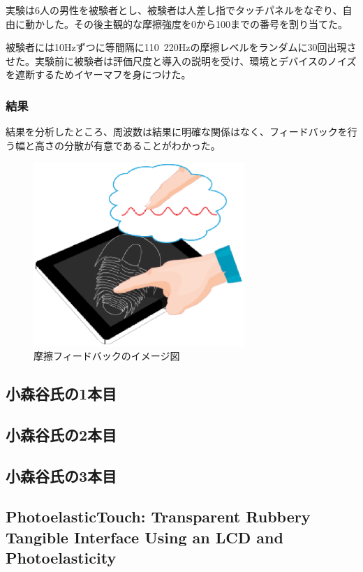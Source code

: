 \documentclass[11pt,a4paper]{jarticle}
\begin{document}
実験は6人の男性を被験者とし、被験者は人差し指でタッチパネルをなぞり、自由に動かした。その後主観的な摩擦強度を0から100までの番号を割り当てた。

被験者には10Hzずつに等間隔に110~220Hzの摩擦レベルをランダムに30回出現させた。実験前に被験者は評価尺度と導入の説明を受け、環境とデバイスのノイズを遮断するためイヤーマフを身につけた。

\subsubsection{結果}
結果を分析したところ、周波数は結果に明確な関係はなく、フィードバックを行う幅と高さの分散が有意であることがわかった。


\begin{figure}[H]
  \begin{center}
  \includegraphics[width=8cm]{figure2.eps}
  \caption{摩擦フィードバックのイメージ図}
  \label{fig:1_test}
  \end{center}
\end{figure}

\subsection{小森谷氏の1本目}

\subsection{小森谷氏の2本目}

\subsection{小森谷氏の3本目}

\subsection{PhotoelasticTouch: Transparent Rubbery Tangible Interface Using an LCD and Photoelasticity\cite{Sato:2009}}
\end{document}
